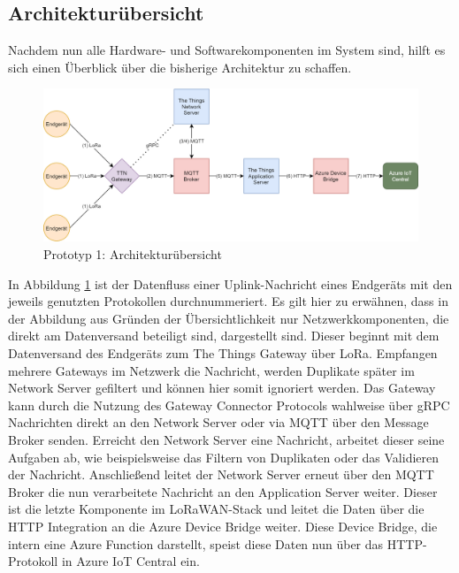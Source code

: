 \subsection{Architekturübersicht}
\label{sec:Prot:architektur1}

Nachdem nun alle Hardware- und Softwarekomponenten im System sind, hilft es sich einen Überblick über die bisherige Architektur zu schaffen.

\begin{figure}[H]
  \vspace{10pt}
  \begin{center}
    \includegraphics[width=1\textwidth]{./images/ttn-architecture.png}
  \end{center}
  \vspace{-5pt}
  \caption[Prototyp 1: Architekturübersicht]{Prototyp 1: Architekturübersicht}
  \label{fig:ttn_prototype_architecture}
  \vspace{-10pt}
\end{figure}

In Abbildung \ref{fig:ttn_prototype_architecture} ist der Datenfluss einer Uplink-Nachricht eines Endgeräts mit den jeweils genutzten Protokollen durchnummeriert. Es gilt hier zu erwähnen, dass in der Abbildung aus Gründen der Übersichtlichkeit nur Netzwerkkomponenten, die direkt am Datenversand beteiligt sind, dargestellt sind. Dieser beginnt mit dem Datenversand des Endgeräts zum The Things Gateway über LoRa. Empfangen mehrere Gateways im Netzwerk die Nachricht, werden Duplikate später im Network Server gefiltert und können hier somit ignoriert werden. Das Gateway kann durch die Nutzung des Gateway Connector Protocols wahlweise über gRPC Nachrichten direkt an den Network Server oder via MQTT über den Message Broker senden. Erreicht den Network Server eine Nachricht, arbeitet dieser seine Aufgaben ab, wie beispielsweise das Filtern von Duplikaten oder das Validieren der Nachricht. Anschließend leitet der Network Server erneut über den MQTT Broker die nun verarbeitete Nachricht an den Application Server weiter. Dieser ist die letzte Komponente im LoRaWAN-Stack und leitet die Daten über die HTTP Integration an die Azure Device Bridge weiter. Diese Device Bridge, die intern eine Azure Function darstellt, speist diese Daten nun über das HTTP-Protokoll in Azure IoT Central ein. 

